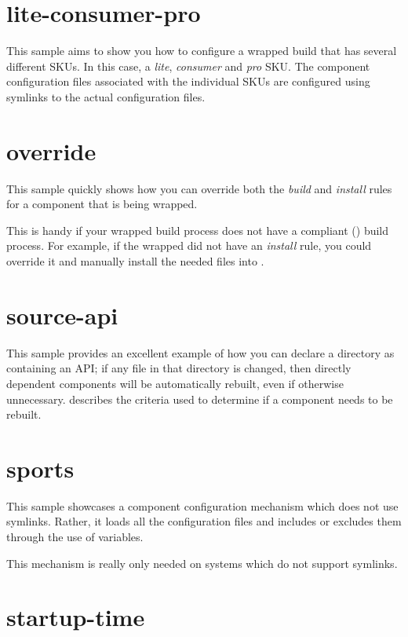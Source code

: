 \section{lite-consumer-pro}

This sample aims to show you how to configure a wrapped build that has
several different SKUs.  In this case, a \emph{lite}, \emph{consumer}
and \emph{pro} SKU.  The component configuration files associated with
the individual SKUs are configured using symlinks to the actual
configuration files.

\section{override}

This sample quickly shows how you can override both the \emph{build}
and \emph{install} rules for a component that is being wrapped.

This is handy if your wrapped build process does not have a compliant
() build process.  For example, if the
wrapped \makefile did not have an \emph{install} rule, you could
override it and manually install the needed files into \destdir.

\section{source-api}

This sample provides an excellent example of how you can declare a
directory as containing an API; if any file in that directory is
changed, then directly dependent components will be automatically
rebuilt, even if otherwise unnecessary.
 describes the criteria used to
determine if a component needs to be rebuilt.

\section{sports}\label{samples:sports}

This sample showcases a component configuration mechanism which does
not use symlinks.  Rather, it loads all the configuration files and
includes or excludes them through the use of \make variables.

This mechanism is really only needed on systems which do not support
symlinks.

\section{startup-time}\label{samples:startup-time}

